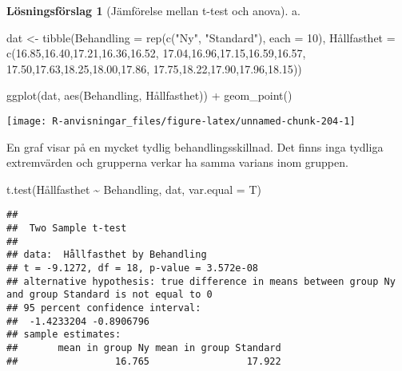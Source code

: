 \documentclass[
]{book}
\newenvironment{Shaded}{\begin{snugshade}}{\end{snugshade}}
\newcommand{\AttributeTok}[1]{\textcolor[rgb]{0.77,0.63,0.00}{#1}}
\newcommand{\DecValTok}[1]{\textcolor[rgb]{0.00,0.00,0.81}{#1}}
\newcommand{\FloatTok}[1]{\textcolor[rgb]{0.00,0.00,0.81}{#1}}
\newcommand{\FunctionTok}[1]{\textcolor[rgb]{0.00,0.00,0.00}{#1}}
\newcommand{\NormalTok}[1]{#1}
\newcommand{\OtherTok}[1]{\textcolor[rgb]{0.56,0.35,0.01}{#1}}
\newcommand{\SpecialCharTok}[1]{\textcolor[rgb]{0.00,0.00,0.00}{#1}}
\newcommand{\StringTok}[1]{\textcolor[rgb]{0.31,0.60,0.02}{#1}}
\theoremstyle{definition}
\theoremstyle{definition}
\theoremstyle{definition}
\theoremstyle{definition}
\newtheorem{hypothesis}{Lösningsförslag}[chapter]
\theoremstyle{remark}
\begin{document}
\begin{hypothesis}[Jämförelse mellan t-test och anova]
a.

\begin{Shaded}
\begin{Highlighting}[]
\NormalTok{dat }\OtherTok{\textless{}{-}} \FunctionTok{tibble}\NormalTok{(}\AttributeTok{Behandling =} \FunctionTok{rep}\NormalTok{(}\FunctionTok{c}\NormalTok{(}\StringTok{"Ny"}\NormalTok{, }\StringTok{"Standard"}\NormalTok{), }\AttributeTok{each =} \DecValTok{10}\NormalTok{),}
\NormalTok{              Hållfasthet }\OtherTok{=} \FunctionTok{c}\NormalTok{(}\FloatTok{16.85}\NormalTok{,}\FloatTok{16.40}\NormalTok{,}\FloatTok{17.21}\NormalTok{,}\FloatTok{16.36}\NormalTok{,}\FloatTok{16.52}\NormalTok{,}
                              \FloatTok{17.04}\NormalTok{,}\FloatTok{16.96}\NormalTok{,}\FloatTok{17.15}\NormalTok{,}\FloatTok{16.59}\NormalTok{,}\FloatTok{16.57}\NormalTok{,}
                              \FloatTok{17.50}\NormalTok{,}\FloatTok{17.63}\NormalTok{,}\FloatTok{18.25}\NormalTok{,}\FloatTok{18.00}\NormalTok{,}\FloatTok{17.86}\NormalTok{,}
                              \FloatTok{17.75}\NormalTok{,}\FloatTok{18.22}\NormalTok{,}\FloatTok{17.90}\NormalTok{,}\FloatTok{17.96}\NormalTok{,}\FloatTok{18.15}\NormalTok{))}

\FunctionTok{ggplot}\NormalTok{(dat, }\FunctionTok{aes}\NormalTok{(Behandling, Hållfasthet)) }\SpecialCharTok{+}
  \FunctionTok{geom\_point}\NormalTok{()}
\end{Highlighting}
\end{Shaded}

\begin{center}\texttt{[image: R-anvisningar\_files/figure-latex/unnamed-chunk-204-1]} \end{center}

En graf visar på en mycket tydlig behandlingsskillnad. Det finns inga tydliga extremvärden och grupperna verkar ha samma varians inom gruppen.

\begin{Shaded}
\begin{Highlighting}[]
\FunctionTok{t.test}\NormalTok{(Hållfasthet }\SpecialCharTok{\textasciitilde{}}\NormalTok{ Behandling, dat, }\AttributeTok{var.equal =}\NormalTok{ T)}
\end{Highlighting}
\end{Shaded}

\begin{verbatim}
## 
##  Two Sample t-test
## 
## data:  Hållfasthet by Behandling
## t = -9.1272, df = 18, p-value = 3.572e-08
## alternative hypothesis: true difference in means between group Ny and group Standard is not equal to 0
## 95 percent confidence interval:
##  -1.4233204 -0.8906796
## sample estimates:
##       mean in group Ny mean in group Standard 
##                 16.765                 17.922
\end{verbatim}


\end{hypothesis}
\end{document}
